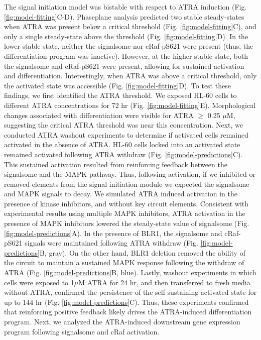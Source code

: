 \documentclass[12pt]{article}
\begin{document}
The signal initiation model was bistable with respect to ATRA induction (Fig. \ref{fig:model-fitting}C-D).
Phaseplane analysis predicted two stable steady-states when ATRA was present below a critical threshold (Fig. \ref{fig:model-fitting}C),
and only a single steady-state above the threshold (Fig. \ref{fig:model-fitting}D).
In the lower stable state, neither the signalsome nor cRaf-pS621 were present (thus, the differentiation program was inactive).
However, at the higher stable state, both the signalsome and cRaf-pS621 were present, allowing for sustained activation and differentiation.
Interestingly, when ATRA was above a critical threshold, only the activated state was accessible (Fig. \ref{fig:model-fitting}D).
To test these findings, we first identified the ATRA threshold. We exposed HL-60 cells to different ATRA concentrations for 72 hr (Fig. \ref{fig:model-fitting}E).
Morphological changes associated with differentiation were visible for ATRA $\geq$ 0.25 $\mu$M, suggesting the critical ATRA
threshold was near this concentration. Next, we conducted ATRA washout experiments to determine if activated cells remained activated in the absence of ATRA.
HL-60 cells locked into an activated state remained activated following ATRA withdraw (Fig. \ref{fig:model-predictions}C).
This sustained activation resulted from reinforcing feedback between the signalsome and the MAPK pathway.
Thus, following activation, if we inhibited or removed elements from the signal initiation module we expected the signalsome and MAPK signals to decay.
We simulated ATRA induced activation in the presence of kinase inhibitors, and without key circuit elements.
Consistent with experimental results using multiple MAPK inhibitors, ATRA activation in the presence of MAPK inhibitors lowered the steady-state value of signalsome (Fig. \ref{fig:model-predictions}A).
In the presence of BLR1, the signalsome and cRaf-pS621 signals were maintained following ATRA withdraw (Fig. \ref{fig:model-predictions}B, gray).
On the other hand, BLR1 deletion removed the ability of the circuit to maintain a sustained MAPK response following the withdraw of ATRA (Fig. \ref{fig:model-predictions}B, blue).
Lastly, washout experiments in which cells were exposed to 1$\mu$M ATRA for 24 hr, and then transferred to fresh media without ATRA,
confirmed the persistence of the self sustaining activated state for up to 144 hr (Fig. \ref{fig:model-predictions}C).
Thus, these experiments confirmed that reinforcing positive feedback likely drives the ATRA-induced differentiation program.
Next, we analyzed the ATRA-induced downstream gene expression program following signalsome and cRaf activation.
\end{document}
